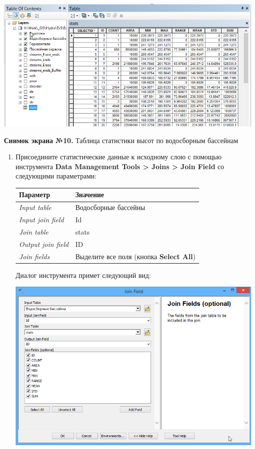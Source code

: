 \documentclass[12pt,]{book}
\begin{document}
\includegraphics{images/Ex15/image26.png}

\textbf{Снимок экрана №10.} Таблица статистики высот по водосборным бассейнам

\begin{enumerate}
\def\labelenumi{\arabic{enumi}.}
\item
  Присоедините статистические данные к исходному слою с помощью инструмента \textbf{Data Management Tools \textgreater{} Joins \textgreater{} Join Field} со следующими параметрами:

  \begin{longtable}[]{@{}ll@{}}
  \toprule
  Параметр & Значение\tabularnewline
  \midrule
  \endhead
  \emph{Input table} & Водосборные бассейны\tabularnewline
  \emph{Input join field} & Id\tabularnewline
  \emph{Join table} & stats\tabularnewline
  \emph{Output join field} & ID\tabularnewline
  \emph{Join fields} & Выделите все поля (кнопка \textbf{Select All})\tabularnewline
  \bottomrule
  \end{longtable}

  Диалог инструмента примет следующий вид:

  \includegraphics{images/Ex15/image27.png}


\end{enumerate}
\end{document}
